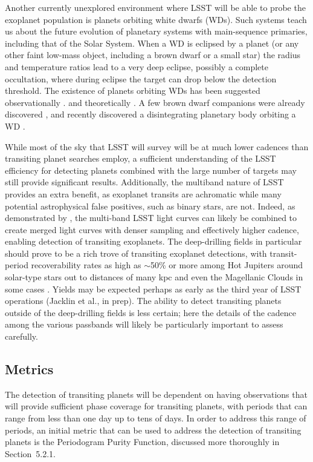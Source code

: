 Another currently unexplored environment where LSST will be able to
probe the exoplanet population is planets orbiting white dwarfs (WDs).
Such systems teach us about the future evolution of planetary systems
with main-sequence primaries, including that of the Solar System. When a
WD is eclipsed by a planet (or any other faint low-mass object,
including a brown dwarf or a small star) the radius and temperature
ratios lead to a very deep eclipse, possibly a complete occultation,
where during eclipse the target can drop below the detection threshold.
The existence of planets orbiting WDs has been suggested
observationally
\citep[e.g.,][]{2009ApJ...694..805F,2009AJ....137.3191J,2010ApJ...722..725Z,2012ApJ...747..148D}.
and theoretically \citep[e.g.,][]{2010MNRAS.408..631N}.
A few brown dwarf companions were already discovered
\citep[e.g.,][]{2006Natur.442..543M,2012ApJ...759L..34C,2006Sci...314.1578L,2014MNRAS.445.2106L},
and \citet{2015Natur.526..546V}
recently discovered a disintegrating planetary body orbiting a WD
\citep[see also][]{2015arXiv151006434C,2016ApJ...818L...7G,2016MNRAS.458.3904R}.

While most of the sky that LSST will survey will be at much lower
cadences than transiting planet searches employ, a sufficient
understanding of the LSST efficiency for detecting planets combined with
the large number of targets may still provide significant results.
Additionally, the multiband nature of LSST provides an extra benefit, as
exoplanet transits are achromatic while many potential astrophysical
false positives, such as binary stars, are not.
Indeed, as demonstrated by \citet{2015AJ....149...16L}, the multi-band LSST light curves 
can likely be combined to create merged light curves with denser sampling and effectively 
higher cadence, enabling detection of transiting exoplanets. The deep-drilling fields in
particular should prove to be a rich trove of transiting exoplanet detections, with 
transit-period recoverability rates as high as $\sim$50\% or more among Hot Jupiters around 
solar-type stars out to distances of many kpc and even the Magellanic Clouds in some cases 
\citep{2015AJ....149...16L,2015AJ....150...34J}.
Yields may be expected perhaps as early as the third year of LSST operations 
(Jacklin et al., in prep).
The ability to detect transiting planets outside of the deep-drilling fields is less certain;
here the details of the cadence among the various passbands will likely be particularly
important to assess carefully.


\subsection{Metrics}
\label{sec:\secname:metrics}
The detection of transiting planets will be dependent on having observations
that will provide sufficient phase coverage for transiting planets, with periods
that can range from less than one day up to tens of days. In order to address
this range of periods, an initial metric that can be used to address the detection
of transiting planets is the Periodogram Purity Function, discussed more thoroughly
in Section~5.2.1.


